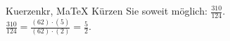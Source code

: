 \begin{MAufgabe}{Kuerzen}{kr, MaTeX}
K\"urzen Sie soweit m\"oglich: $\frac{310}{124}$.\\ 
\ifLsg\MLoesung
\quad $\frac{310}{124}=\frac{(62)\cdot(5)}{(62)\cdot(2)}=\frac{5}{2}$.\else\relax\fi
 \end{MAufgabe}